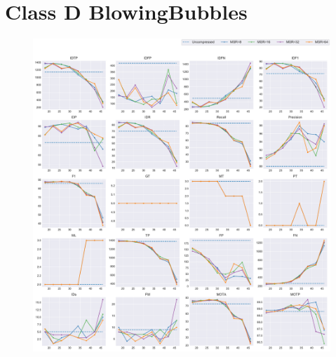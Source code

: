 
\section{Class D BlowingBubbles}
\label{sec:appendix/BlowingBubbles_all}


\begin{figure}[!htbp]
\centering
\includegraphics[width=1.0\linewidth]{img/appendix/BlowingBubbles_all_multiplots_qp.pdf}
\caption[Result of all object classes in Class D BlowingBubbles with Horizontal Axis of QP]{}
\label{fig:BlowingBubbles_all_qp}
\end{figure}

